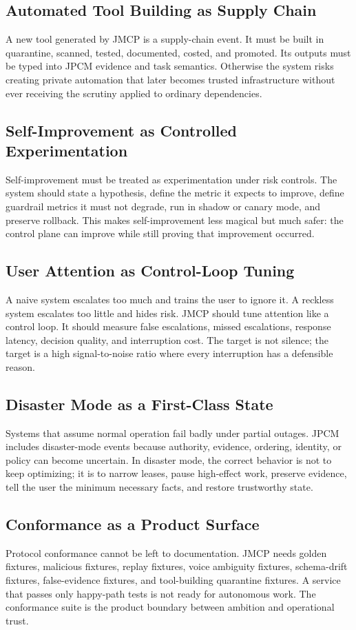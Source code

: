 \documentclass[10pt,journal,onecolumn]{IEEEtran}
\begin{document}
\subsection{Automated Tool Building as Supply Chain}
A new tool generated by JMCP is a supply-chain event. It must be built in quarantine, scanned, tested, documented, costed, and promoted. Its outputs must be typed into JPCM evidence and task semantics. Otherwise the system risks creating private automation that later becomes trusted infrastructure without ever receiving the scrutiny applied to ordinary dependencies.

\subsection{Self-Improvement as Controlled Experimentation}
Self-improvement must be treated as experimentation under risk controls. The system should state a hypothesis, define the metric it expects to improve, define guardrail metrics it must not degrade, run in shadow or canary mode, and preserve rollback. This makes self-improvement less magical but much safer: the control plane can improve while still proving that improvement occurred.

\subsection{User Attention as Control-Loop Tuning}
A naive system escalates too much and trains the user to ignore it. A reckless system escalates too little and hides risk. JMCP should tune attention like a control loop. It should measure false escalations, missed escalations, response latency, decision quality, and interruption cost. The target is not silence; the target is a high signal-to-noise ratio where every interruption has a defensible reason.

\subsection{Disaster Mode as a First-Class State}
Systems that assume normal operation fail badly under partial outages. JPCM includes disaster-mode events because authority, evidence, ordering, identity, or policy can become uncertain. In disaster mode, the correct behavior is not to keep optimizing; it is to narrow leases, pause high-effect work, preserve evidence, tell the user the minimum necessary facts, and restore trustworthy state.

\subsection{Conformance as a Product Surface}
Protocol conformance cannot be left to documentation. JMCP needs golden fixtures, malicious fixtures, replay fixtures, voice ambiguity fixtures, schema-drift fixtures, false-evidence fixtures, and tool-building quarantine fixtures. A service that passes only happy-path tests is not ready for autonomous work. The conformance suite is the product boundary between ambition and operational trust.
\end{document}
